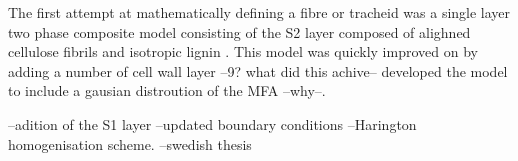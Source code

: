  The first attempt at mathematically defining a fibre or tracheid was a single layer two phase composite model consisting of the S2 layer composed of alighned cellulose fibrils and isotropic lignin \cite{Barber_1964}. This model was quickly improved on by \cite{mark1967cell} adding a number of cell wall layer --9? what did this achive-- \cite{Cave_1968} developed the model to include a gausian distroution of the MFA --why--. 
 
 --adition of the S1 layer
 --updated boundary conditions
 --Harington homogenisation scheme. 
 --swedish thesis
 
